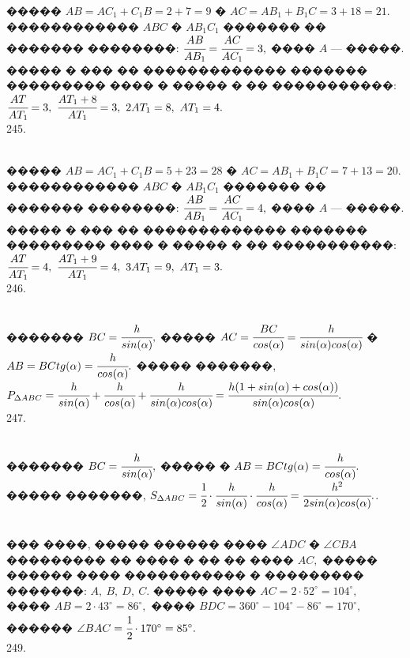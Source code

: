 \documentclass[12pt]{article}
\begin{document}
����� $AB=AC_1+C_1B=2+7=9$ � $AC=AB_1+B_1C=3+18=21.$ ������������ $ABC$ � $AB_1C_1$ ������� �� ������� ��������: $\cfrac{AB}{AB_1}=\cfrac{AC}{AC_1}=3,$ ���� $A$ --- �����. ����� � ��� �� ������������� ������� ��������� ���� � ����� � �� �����������: $\cfrac{AT}{AT_1}=3,\ \cfrac{AT_1+8}{AT_1}=3,\ 2AT_1=8,\ AT_1=4.$\\
245. \begin{figure}[ht!]
\end{figure}\\
����� $AB=AC_1+C_1B=5+23=28$ � $AC=AB_1+B_1C=7+13=20.$ ������������ $ABC$ � $AB_1C_1$ ������� �� ������� ��������: $\cfrac{AB}{AB_1}=\cfrac{AC}{AC_1}=4,$ ���� $A$ --- �����. ����� � ��� �� ������������� ������� ��������� ���� � ����� � �� �����������: $\cfrac{AT}{AT_1}=4,\ \cfrac{AT_1+9}{AT_1}=4,\ 3AT_1=9,\ AT_1=3.$\\
246. \begin{figure}[ht!]
\end{figure}\\
������� $BC=\cfrac{h}{sin(\alpha)},$ ����� $AC=\cfrac{BC}{cos(\alpha)}=\cfrac{h}{sin(\alpha)cos(\alpha)}$ � $AB=BC tg(\alpha)=\cfrac{h}{cos(\alpha)}.$ ����� �������, $P_{\Delta ABC}=\cfrac{h}{sin(\alpha)}+\cfrac{h}{cos(\alpha)}+\cfrac{h}{sin(\alpha)cos(\alpha)}=
\cfrac{h(1+sin(\alpha)+cos(\alpha))}{sin(\alpha)cos(\alpha)}.$\\
247. \begin{figure}[ht!]
\end{figure}\\
������� $BC=\cfrac{h}{sin(\alpha)},$ ����� � $AB=BC tg(\alpha)=\cfrac{h}{cos(\alpha)}.$ ����� �������, $S_{\Delta ABC}=
\cfrac{1}{2}\cdot\cfrac{h}{sin(\alpha)}\cdot\cfrac{h}{cos(\alpha)}=
\cfrac{h^2}{2sin(\alpha)cos(\alpha)}.$\newpage{}. \begin{figure}[ht!]
\end{figure}\\
��� ����, ����� ������ ���� $\angle ADC$ � $\angle CBA$ ��������� �� ���� � �� �� ���� $AC,$ ����� ������ ���� ����������� � ��������� �������: $A,\ B,\ D,\ C.$ ����� ���� $AC=2\cdot 52^\circ=104^\circ,$ ���� $AB=2\cdot43^\circ=86^\circ,$ ���� $BDC=360^\circ-104^\circ-86^\circ=170^\circ,$ ������ $\angle BAC=\cfrac{1}{2}\cdot 170^\circ=85^\circ.$\\
249. \begin{figure}[ht!]
\end{figure}\\
\end{document}
